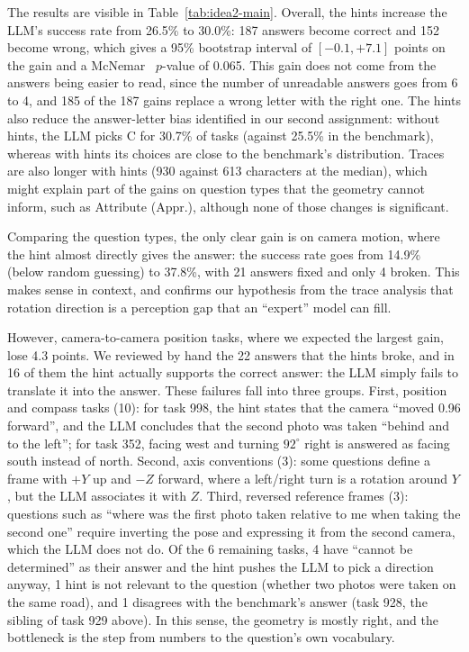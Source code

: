 The results are visible in Table~\ref{tab:idea2-main}. Overall, the hints increase the LLM's success rate from 26.5\% to 30.0\%: 187 answers become correct and 152 become wrong, which gives a 95\% bootstrap interval of $[-0.1,+7.1]$ points on the gain and a McNemar~\citep{mcnemar1947} $p$-value of 0.065. This gain does not come from the answers being easier to read, since the number of unreadable answers goes from 6 to 4, and 185 of the 187 gains replace a wrong letter with the right one. The hints also reduce the answer-letter bias identified in our second assignment: without hints, the LLM picks C for 30.7\% of tasks (against 25.5\% in the benchmark), whereas with hints its choices are close to the benchmark's distribution. Traces are also longer with hints (930 against 613 characters at the median), which might explain part of the gains on question types that the geometry cannot inform, such as Attribute (Appr.), although none of those changes is significant.

Comparing the question types, the only clear gain is on camera motion, where the hint almost directly gives the answer: the success rate goes from 14.9\% (below random guessing) to 37.8\%, with 21 answers fixed and only 4 broken. This makes sense in context, and confirms our hypothesis from the trace analysis that rotation direction is a perception gap that an ``expert'' model can fill.

However, camera-to-camera position tasks, where we expected the largest gain, lose 4.3 points. We reviewed by hand the 22 answers that the hints broke, and in 16 of them the hint actually supports the correct answer: the LLM simply fails to translate it into the answer. These failures fall into three groups. First, position and compass tasks (10): for task 998, the hint states that the camera ``moved 0.96 forward'', and the LLM concludes that the second photo was taken ``behind and to the left''; for task 352, facing west and turning $92^\circ$ right is answered as facing south instead of north. Second, axis conventions (3): some questions define a frame with $+Y$ up and $-Z$ forward, where a left/right turn is a rotation around $Y$, but the LLM associates it with $Z$. Third, reversed reference frames (3): questions such as ``where was the first photo taken relative to me when taking the second one'' require inverting the pose and expressing it from the second camera, which the LLM does not do. Of the 6 remaining tasks, 4 have ``cannot be determined'' as their answer and the hint pushes the LLM to pick a direction anyway, 1 hint is not relevant to the question (whether two photos were taken on the same road), and 1 disagrees with the benchmark's answer (task 928, the sibling of task 929 above). In this sense, the geometry is mostly right, and the bottleneck is the step from numbers to the question's own vocabulary.

